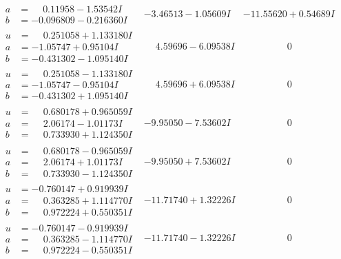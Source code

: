 \documentclass[1p]{elsarticle_modified}
\theoremstyle{definition}
\begin{document}
$$\begin{array}{c|c|c}
\begin{aligned}
a &= \phantom{-}0.11958 - 1.53542 I \\
b &= -0.096809 - 0.216360 I\end{aligned}
 & -3.46513 - 1.05609 I & -11.55620 + 0.54689 I \\ \hline\begin{aligned}
u &= \phantom{-}0.251058 + 1.133180 I \\
a &= -1.05747 + 0.95104 I \\
b &= -0.431302 - 1.095140 I\end{aligned}
 & \phantom{-}4.59696 - 6.09538 I & \phantom{-0.000000 } 0 \\ \hline\begin{aligned}
u &= \phantom{-}0.251058 - 1.133180 I \\
a &= -1.05747 - 0.95104 I \\
b &= -0.431302 + 1.095140 I\end{aligned}
 & \phantom{-}4.59696 + 6.09538 I & \phantom{-0.000000 } 0 \\ \hline\begin{aligned}
u &= \phantom{-}0.680178 + 0.965059 I \\
a &= \phantom{-}2.06174 - 1.01173 I \\
b &= \phantom{-}0.733930 + 1.124350 I\end{aligned}
 & -9.95050 - 7.53602 I & \phantom{-0.000000 } 0 \\ \hline\begin{aligned}
u &= \phantom{-}0.680178 - 0.965059 I \\
a &= \phantom{-}2.06174 + 1.01173 I \\
b &= \phantom{-}0.733930 - 1.124350 I\end{aligned}
 & -9.95050 + 7.53602 I & \phantom{-0.000000 } 0 \\ \hline\begin{aligned}
u &= -0.760147 + 0.919939 I \\
a &= \phantom{-}0.363285 + 1.114770 I \\
b &= \phantom{-}0.972224 + 0.550351 I\end{aligned}
 & -11.71740 + 1.32226 I & \phantom{-0.000000 } 0 \\ \hline\begin{aligned}
u &= -0.760147 - 0.919939 I \\
a &= \phantom{-}0.363285 - 1.114770 I \\
b &= \phantom{-}0.972224 - 0.550351 I\end{aligned}
 & -11.71740 - 1.32226 I & \phantom{-0.000000 } 0 \\ \hline\begin{aligned}

\end{aligned}
\end{array}$$
\end{document}
